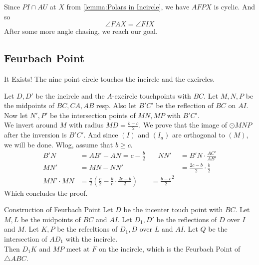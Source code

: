 
\begin{solution}
    Since $PI \cap AU$ at $X$ from \autoref{lemma:Polars in Incircle}, we have
    $AFPX$ is cyclic. And so
    \[\angle FAX = \angle FIX\] 
    After some more angle chasing, we reach our goal.
\end{solution}



\newpage
\subsection{Feurbach Point}


\thmbox{}
{It Exists!}{
    The nine point circle touches the incircle and the excircles.
}

\begin{prooof}[Inversion]
    Let $D, D'$ be the incircle and the $A$-excircle touchpoints with $BC$.
    Let $M, N, P$ be the midpoints of $BC, CA, AB$ resp. Also let $B'C'$ be
    the reflection of $BC$ on $AI$. Now let $N', P'$ be the intersection
    points of $MN, MP$ with $B'C'$. \\

    We invert around $M$ with radius $MD = \frac{b-c}{2}$. We prove that the
    image of $\odot MNP$ after the inversion is $B'C'$. And since $(I)$ and
    $(I_a)$ are orthogonal to $(M)$, we will be done. 
    Wlog, assume that $b \ge c$.
    \[\begin{aligned}
        B'N &= AB' - AN = c - \frac{b}{2} &\quad NN' &= B'N \cdot\frac{AC'}{AB'}\\[.5em]
        MN' &= MN - NN' &\quad &= \frac{2c-b}{2}\cdot \frac{b}{2}\\[1em]
        MN'\cdot MN &= \frac{c}{2}\left(\frac{c}{2} -
        \frac{b}{c}\cdot\frac{2c-b}{2}\right) &= \frac{b-c}{2}^2
    \end{aligned}\]
    Which concludes the proof.
\end{prooof}

\thmbox{}
{Construction of Feurbach Point}{
    Let $D$ be the incenter touch point with $BC$. Let $M, L$ be the midpoints
    of $BC$ and $AI$. Let $D_1, D'$ be the reflections of $D$ over $I$ and
    $M$. Let $K, P$ be the refecltions of $D_1, D$ over $L$ and $AI$. Let $Q$
    be the intersection of $AD_1$ with the incircle.\\

    Then $D_1K$ and $MP$ meet at $F$ on the incircle, which is the Feurbach
    Point of $\triangle ABC$. 
}

